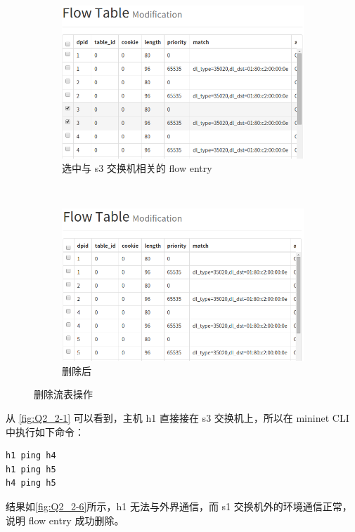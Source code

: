 \documentclass[format=draft,language=chinese,category=SDN]{hustreport}
\begin{document}
\begin{figure}[!h]
\centering
  \begin{subfigure}[b]{.48\textwidth}
  \includegraphics[width=\textwidth]{fig/2_2-4}
  \caption{选中与 s3 交换机相关的 flow entry}\label{fig:Q2_2-4}
  \end{subfigure}
  ~
  \begin{subfigure}[b]{.48\textwidth}
  \includegraphics[width=\textwidth]{fig/2_2-5}
  \caption{删除后}\label{fig:Q2_2-5}
  \end{subfigure}
\caption{删除流表操作}\label{fig:Q2_2-S1}
\end{figure}

从 \autoref{fig:Q2_2-1} 可以看到，主机 h1 直接接在 s3 交换机上，所以在 mininet CLI 中执行如下命令：
\begin{lstlisting}
h1 ping h4
h1 ping h5
h4 ping h5
\end{lstlisting}

结果如\autoref{fig:Q2_2-6}所示，h1 无法与外界通信，而 s1 交换机外的环境通信正常，说明 flow entry 成功删除。
\end{document}
